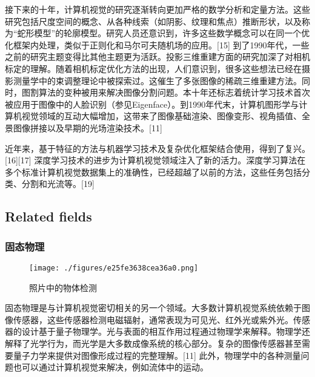 接下来的十年，计算机视觉的研究逐渐转向更加严格的数学分析和定量方法。这些研究包括尺度空间的概念、从各种线索（如阴影、纹理和焦点）推断形状，以及称为“蛇形模型”的轮廓模型。研究人员还意识到，许多这些数学概念可以在同一个优化框架内处理，类似于正则化和马尔可夫随机场的应用。[15] 到了1990年代，一些之前的研究主题变得比其他主题更为活跃。投影三维重建方面的研究加深了对相机标定的理解。随着相机标定优化方法的出现，人们意识到，很多这些想法已经在摄影测量学中的束调整理论中被探索过。这催生了多张图像的稀疏三维重建方法。同时，图割算法的变种被用来解决图像分割问题。本十年还标志着统计学习技术首次被应用于图像中的人脸识别（参见Eigenface）。到1990年代末，计算机图形学与计算机视觉领域的互动大幅增加，这带来了图像基础渲染、图像变形、视角插值、全景图像拼接以及早期的光场渲染技术。[11]

近年来，基于特征的方法与机器学习技术及复杂优化框架结合使用，得到了复兴。[16][17] 深度学习技术的进步为计算机视觉领域注入了新的活力。深度学习算法在多个标准计算机视觉数据集上的准确性，已经超越了以前的方法，这些任务包括分类、分割和光流等。[19]
\subsection{Related fields}
\subsubsection{固态物理}  
\begin{figure}[ht]
\centering
\texttt{[image: ./figures/e25fe3638cea36a0.png]}
\caption{照片中的物体检测} \label{fig_JSJ_1}
\end{figure}
固态物理是与计算机视觉密切相关的另一个领域。大多数计算机视觉系统依赖于图像传感器，这些传感器检测电磁辐射，通常表现为可见光、红外光或紫外光。传感器的设计基于量子物理学。光与表面的相互作用过程通过物理学来解释。物理学还解释了光学行为，而光学是大多数成像系统的核心部分。复杂的图像传感器甚至需要量子力学来提供对图像形成过程的完整理解。[11] 此外，物理学中的各种测量问题也可以通过计算机视觉来解决，例如流体中的运动。
